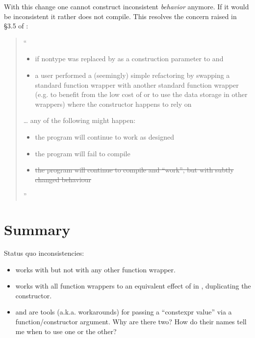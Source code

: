 With this change one cannot construct inconsistent \emph{behavior} anymore.
If it would be inconsistent it rather does not compile.
This resolves the concern raised in §3.5 of \cite{P3792R0}:
\begin{quote}{}
  “
  \begin{itemize}
    \item if nontype was replaced by  as a construction parameter to
       and
    \item a user performed a (seemingly) simple refactoring by swapping a standard function wrapper
      with another standard function wrapper (e.g. to benefit from the low cost of
       or to use the data storage in other wrappers) where the constructor
        happens to rely on 
  \end{itemize}
… any of the following might happen:
  \begin{itemize}
    \item the program will continue to work as designed
    \item the program will fail to compile
    \item \st{the program will continue to compile and “work”, but with subtly changed behaviour}
  \end{itemize}
  ”
\end{quote}

\section{Summary}
Status quo inconsistencies:
\begin{itemize}
  \item {} works with  but not with any other function wrapper.

  \item {} works with all function wrappers to an equivalent effect of
     in , duplicating the  constructor.

  \item {} and  are tools (a.k.a. workarounds) for passing a
    “constexpr value” via a function/constructor argument.
    Why are there two?
    How do their names tell me when to use one or the other?
\end{itemize}

